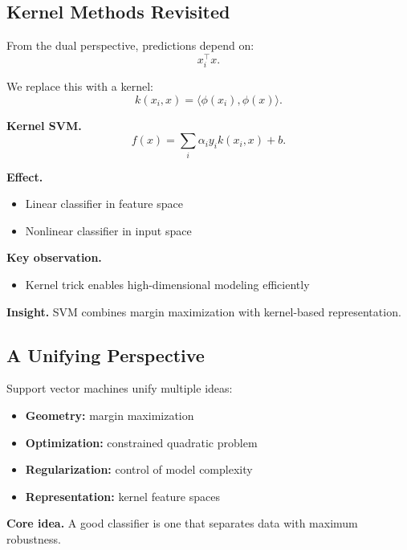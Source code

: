 \subsection{Kernel Methods Revisited}

From the dual perspective, predictions depend on:
\[
x_i^\top x.
\]

\medskip

\noindent
We replace this with a kernel:
\[
k(x_i, x) = \langle \phi(x_i), \phi(x) \rangle.
\]

\medskip

\noindent
\textbf{Kernel SVM.}
\[
f(x) = \sum_i \alpha_i y_i k(x_i, x) + b.
\]

\medskip

\noindent
\textbf{Effect.}
\begin{itemize}
    \item Linear classifier in feature space
    \item Nonlinear classifier in input space
\end{itemize}

\medskip

\noindent
\textbf{Key observation.}
\begin{itemize}
    \item Kernel trick enables high-dimensional modeling efficiently
\end{itemize}

\medskip

\noindent
\textbf{Insight.}  
SVM combines margin maximization with kernel-based representation.

\subsection{A Unifying Perspective}

Support vector machines unify multiple ideas:

\begin{itemize}
    \item \textbf{Geometry:} margin maximization
    \item \textbf{Optimization:} constrained quadratic problem
    \item \textbf{Regularization:} control of model complexity
    \item \textbf{Representation:} kernel feature spaces
\end{itemize}

\medskip

\noindent
\textbf{Core idea.}  
A good classifier is one that separates data with maximum robustness.

